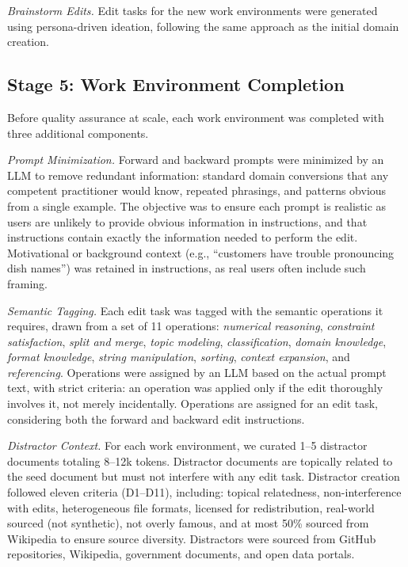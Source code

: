 \documentclass{article} %
\begin{document}
\textit{Brainstorm Edits.} Edit tasks for the new work environments were generated using persona-driven ideation, following the same approach as the initial domain creation.

\subsection{Stage 5: Work Environment Completion} \label{app:env_completion}
Before quality assurance at scale, each work environment was completed with three additional components.

\textit{Prompt Minimization.} Forward and backward prompts were minimized by an LLM to remove redundant information: standard domain conversions that any competent practitioner would know, repeated phrasings, and patterns obvious from a single example. The objective was to ensure each prompt is realistic as users are unlikely to provide obvious information in instructions, and that instructions contain exactly the information needed to perform the edit. Motivational or background context (e.g., ``customers have trouble pronouncing dish names'') was retained in instructions, as real users often include such framing.

\textit{Semantic Tagging.} Each edit task was tagged with the semantic operations it requires, drawn from a set of 11 operations: \textit{numerical reasoning}, \textit{constraint satisfaction}, \textit{split and merge}, \textit{topic modeling}, \textit{classification}, \textit{domain knowledge}, \textit{format knowledge}, \textit{string manipulation}, \textit{sorting}, \textit{context expansion}, and \textit{referencing}. Operations were assigned by an LLM based on the actual prompt text, with strict criteria: an operation was applied only if the edit thoroughly involves it, not merely incidentally. Operations are assigned for an edit task, considering both the forward and backward edit instructions.

\textit{Distractor Context.} For each work environment, we curated 1--5 distractor documents totaling 8--12k tokens. Distractor documents are topically related to the seed document but must not interfere with any edit task. Distractor creation followed eleven criteria (D1--D11), including: topical relatedness, non-interference with edits, heterogeneous file formats, licensed for redistribution, real-world sourced (not synthetic), not overly famous, and at most 50\% sourced from Wikipedia to ensure source diversity. Distractors were sourced from GitHub repositories, Wikipedia, government documents, and open data portals.
\end{document}
